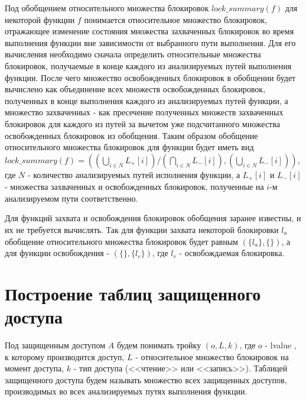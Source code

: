 Под обобщением относительного множества блокировок $lock\_summary(f)$ для некоторой функции $f$ понимается относительное множество блокировок, отражающее изменение состояния множества захваченных блокировок во время выполнения функции вне зависимости от выбранного пути выполнения. Для его вычисления необходимо сначала определить относительные множества блокировок, получаемые в конце каждого из анализируемых путей выполнения функции. После чего множество освобожденных блокировок в обобщении будет вычислено как объединение всех множеств освобожденных блокировок, полученных в конце выполнения каждого из анализируемых путей функции, а множество захваченных - как пресечение полученных множеств захваченных блокировок для каждого из путей за вычетом уже подсчитанного множества освобожденных блокировок из обобщения. Таким образом обобщение относительного множества блокировок для функции будет иметь вид $lock\_summary(f) = ((\bigcup_{i \in N}L_{+}[i])/(\bigcap_{i \in N}L_{-}[i]), (\bigcup_{i \in N}L_{-}[i]))$, где $N$ - количество анализируемых путей исполнения функции, а $L_{+}[i]$ и $L_{-}[i]$ - множества захваченных и освобожденных блокировок, полученные на $i$-м анализируемом пути соответственно.

Для функций захвата и освобождения блокировок обобщения заранее известны, и их не требуется вычислять. Так для функции захвата некоторой блокировки $l_{a}$ обобщение относительного множества блокировок будет равным $(\{l_{a}\}, \{\})$, а для функции освобождения - $(\{\}, \{l_{r}\})$, где $l_{r}$ - освобождаемая блокировка.

\section{Построение таблиц защищенного доступа}
\label{sec:build-tables}

Под защищенным доступом $A$ будем понимать тройку $(o, L, k)$, где $o$ - lvalue \cite{Kernigan}, к которому производится доступ, $L$ - относительное множество блокировок на момент доступа, $k$ - тип доступа (<<чтение>> или <<запись>>). Таблицей защищенного доступа будем называть множество всех защищенных доступов, производимых во всех анализируемых путях выполнения функции.

